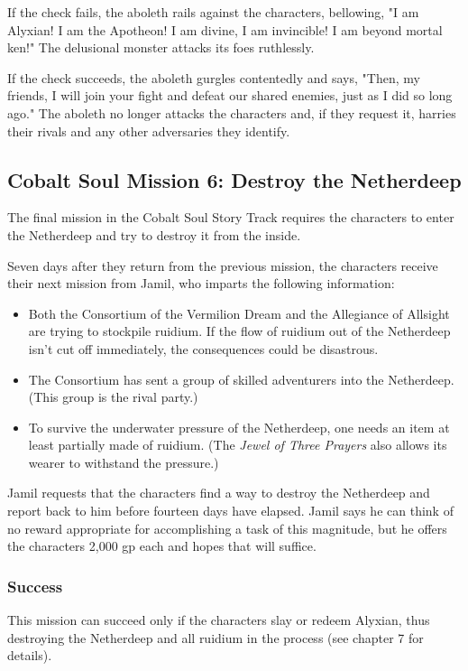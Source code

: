 \documentclass[10pt,a4paper,twoside,fancy,bg=print,twocolumn,openany,nodeprecatedcode]{dndbook}
\begin{document}
If the check fails, the aboleth rails against the characters, bellowing, "I am Alyxian! I am the Apotheon! I am divine, I am invincible! I am beyond mortal ken!" The delusional monster attacks its foes ruthlessly.

If the check succeeds, the aboleth gurgles contentedly and says, "Then, my friends, I will join your fight and defeat our shared enemies, just as I did so long ago." The aboleth no longer attacks the characters and, if they request it, harries their rivals and any other adversaries they identify.

\subsection{Cobalt Soul Mission 6: Destroy the Netherdeep}
The final mission in the Cobalt Soul Story Track requires the characters to enter the Netherdeep and try to destroy it from the inside.

Seven days after they return from the previous mission, the characters receive their next mission from Jamil, who imparts the following information:


\begin{itemize}
\item Both the Consortium of the Vermilion Dream and the Allegiance of Allsight are trying to stockpile ruidium. If the flow of ruidium out of the Netherdeep isn't cut off immediately, the consequences could be disastrous.
\item The Consortium has sent a group of skilled adventurers into the Netherdeep. (This group is the rival party.)
\item To survive the underwater pressure of the Netherdeep, one needs an item at least partially made of ruidium. (The \textit{Jewel of Three Prayers} also allows its wearer to withstand the pressure.)
\end{itemize}

Jamil requests that the characters find a way to destroy the Netherdeep and report back to him before fourteen days have elapsed. Jamil says he can think of no reward appropriate for accomplishing a task of this magnitude, but he offers the characters 2,000 gp each and hopes that will suffice.

\subsubsection{Success}
This mission can succeed only if the characters slay or redeem Alyxian, thus destroying the Netherdeep and all ruidium in the process (see chapter 7 for details).
\end{document}
